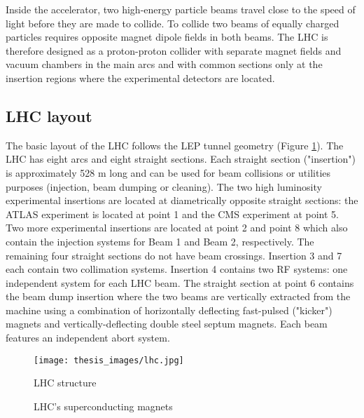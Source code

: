\documentclass[a4paper, oneside, 11pt, openright]{book}
\begin{document}
			Inside the accelerator, two high-energy particle beams travel close to the speed of light before they are made to collide. To collide two beams of equally charged particles requires opposite magnet dipole fields in both beams. The LHC is therefore designed as a proton-proton collider with separate magnet fields and vacuum chambers in the main arcs and with common sections only at the insertion regions where the experimental detectors are located. 
		
			\subsection{LHC layout}
				The basic layout of the LHC \cite{LHC_DESIGN_2004} follows the LEP tunnel geometry (Figure \ref{fig:LHC_layout}). The LHC has eight arcs and eight straight sections. Each straight section ("insertion") is approximately 528 m long and can be used for beam collisions or utilities purposes (injection, beam dumping or cleaning). The two high luminosity experimental insertions are located at diametrically opposite straight sections: the {ATLAS} experiment is located at point 1 and the CMS experiment at point 5. Two more experimental insertions are located at point 2 and point 8 which also contain the injection systems for Beam 1 and Beam 2, respectively. The remaining four straight sections do not have beam crossings. Insertion 3 and 7 each contain two collimation systems. Insertion 4 contains two RF systems: one independent system for each LHC beam. The straight section at point 6 contains the beam dump insertion where the two beams are vertically extracted from the machine using a combination of horizontally deflecting fast-pulsed ("kicker") magnets and vertically-deflecting double steel septum magnets. Each beam features an independent abort system.
				
				\begin{figure}[H]
					\centering
					\texttt{[image: thesis\_images/lhc.jpg]}
					\caption{LHC structure}
					\label{fig:LHC_layout}
				\end{figure}
				
				\begin{figure}[H]
					\centering
					 \quad
					\caption{LHC's superconducting magnets}
					\label{fig:magnets}
				\end{figure}
				
\end{document}
